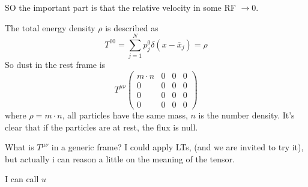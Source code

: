 SO the important part is that the relative velocity in some RF $\to 0$.

The total energy density $\rho $ is described as 
\[
	T^{00} = \sum_{j = 1}^{N}{p^{0}_{j} \delta\left( x- \overline{x}_{j} \right)} = \rho 
\]
So dust in the rest frame is 
\begin{equation}
T^{\mu \nu }\begin{pmatrix}
m\cdot n & 0 & 0 & 0 \\
0 & 0 & 0 & 0 \\
0 & 0 & 0 & 0 \\
0 & 0 & 0 & 0
\end{pmatrix} 
\end{equation}
where $\rho = m\cdot n$, all particles have the same mass, $n$ is the number density. It's clear that if the particles are at rest, the flux is null.

What is $T^{\mu \nu }$ in a generic frame? I could apply LTs, (and we are invited to try it), but actually i can reason a little on the meaning of the tensor.

I can call $u^{}$

